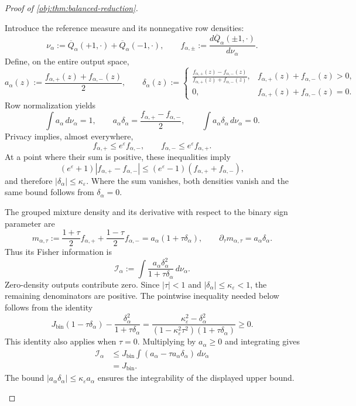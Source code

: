 \begin{proof}[Proof of \cref{obj:thm:balanced-reduction}]
\begin{enumerate}
Introduce the reference measure and its nonnegative row densities:
\[
\nu_\alpha
:=\overline Q_\alpha(+1,\cdot)
+\overline Q_\alpha(-1,\cdot),
\qquad
f_{\alpha,\pm}
:=\frac{d\overline Q_\alpha(\pm1,\cdot)}{d\nu_\alpha}.
\]
Define, on the entire output space,
\[
a_\alpha(z)
:=\frac{f_{\alpha,+}(z)+f_{\alpha,-}(z)}2,
\qquad
\delta_\alpha(z)
:=
\begin{cases}
\displaystyle
\frac{f_{\alpha,+}(z)-f_{\alpha,-}(z)}
{f_{\alpha,+}(z)+f_{\alpha,-}(z)},
& f_{\alpha,+}(z)+f_{\alpha,-}(z)>0,\\[6pt]
0,& f_{\alpha,+}(z)+f_{\alpha,-}(z)=0.
\end{cases}
\]
Row normalization yields
\[
\int a_\alpha\,d\nu_\alpha=1,
\qquad
a_\alpha\delta_\alpha
=\frac{f_{\alpha,+}-f_{\alpha,-}}2,
\qquad
\int a_\alpha\delta_\alpha\,d\nu_\alpha=0.
\]
Privacy implies, almost everywhere,
\[
f_{\alpha,+}\le e^\varepsilon f_{\alpha,-},
\qquad
f_{\alpha,-}\le e^\varepsilon f_{\alpha,+}.
\]
At a point where their sum is positive, these inequalities imply
\[
(e^\varepsilon+1)|f_{\alpha,+}-f_{\alpha,-}|
\le
(e^\varepsilon-1)(f_{\alpha,+}+f_{\alpha,-}),
\]
and therefore \(|\delta_\alpha|\le\kappa_\varepsilon\).
Where the sum vanishes, both densities vanish and the same bound follows
from \(\delta_\alpha=0\).

The grouped mixture density and its derivative with respect to the
binary sign parameter are
\[
m_{\alpha,\tau}
:=\frac{1+\tau}{2}f_{\alpha,+}
+\frac{1-\tau}{2}f_{\alpha,-}
=a_\alpha(1+\tau\delta_\alpha),
\qquad
\partial_\tau m_{\alpha,\tau}=a_\alpha\delta_\alpha.
\]
Thus its Fisher information is
\[
\mathcal I_\alpha
:=\int
\frac{a_\alpha\delta_\alpha^2}
{1+\tau\delta_\alpha}\,d\nu_\alpha.
\]
Zero-density outputs contribute zero. Since
\(|\tau|<1\) and \(|\delta_\alpha|\le\kappa_\varepsilon<1\), the remaining
denominators are positive. The pointwise inequality needed below follows
from the identity
\[
J_{\mathrm{bin}}(1-\tau\delta_\alpha)
-\frac{\delta_\alpha^2}{1+\tau\delta_\alpha}
=
\frac{\kappa_\varepsilon^2-\delta_\alpha^2}
{(1-\kappa_\varepsilon^2\tau^2)(1+\tau\delta_\alpha)}
\ge0.
\]
This identity also applies when \(\tau=0\).
Multiplying by \(a_\alpha\ge0\) and integrating gives
\[
\begin{aligned}
\mathcal I_\alpha
&\le
J_{\mathrm{bin}}
\int(a_\alpha-\tau a_\alpha\delta_\alpha)\,d\nu_\alpha\\
&=J_{\mathrm{bin}}.
\end{aligned}
\]
The bound \(|a_\alpha\delta_\alpha|\le\kappa_\varepsilon a_\alpha\)
ensures the integrability of the displayed upper bound.


\end{enumerate}
\end{proof}
